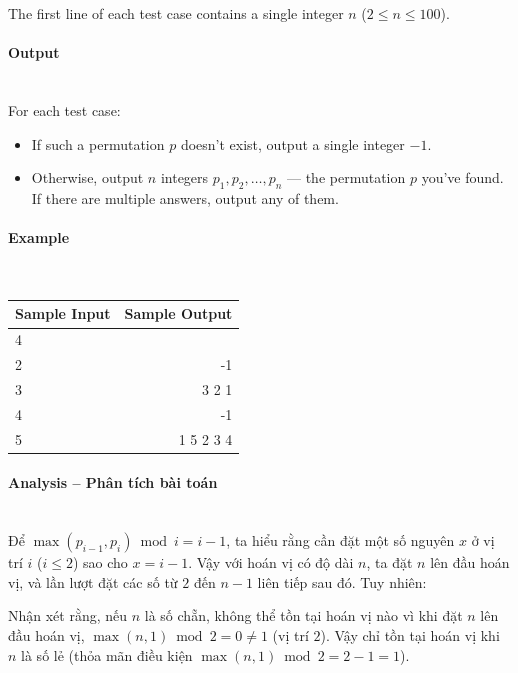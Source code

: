 \documentclass{article}
\begin{document}
The first line of each test case contains a single integer $n$ ($2 \le n \le 100$).

\paragraph{Output}\mbox{} \\

For each test case:

\begin{itemize}
    \item If such a permutation $p$ doesn't exist, output a single integer $-1$.
    \item Otherwise, output $n$ integers $p_1, p_2, \ldots, p_n$ — the permutation $p$ you’ve found. If there are multiple answers, output any of them.
\end{itemize}

\paragraph{Example}\mbox{} \\

\begin{table}[h]
    \centering
    \begin{tabular}{|l|r|}
        \hline
        \rowcolor{gray!30}
        \textbf{Sample Input} & \textbf{Sample Output} \\
        \hline
        4 & \\
        2 & -1 \\
        3 & 3 2 1 \\
        4 & -1 \\
        5 & 1 5 2 3 4 \\
        \hline
    \end{tabular}
\end{table}


\paragraph{Analysis -- Phân tích bài toán} \mbox{} \\

Để $\max(p_{i-1}, p_i) \bmod i = i - 1$, ta hiểu rằng cần đặt một số nguyên $x$ ở vị trí $i$ ($i \leq 2$) sao cho $x = i - 1$. Vậy với hoán vị có độ dài $n$, ta đặt $n$ lên đầu hoán vị, và lần lượt đặt các số từ $2$ đến $n - 1$ liên tiếp sau đó. Tuy nhiên:

Nhận xét rằng, nếu $n$ là số chẵn, không thể tồn tại hoán vị nào vì khi đặt $n$ lên đầu hoán vị, $\max(n, 1) \bmod 2 = 0 \ne 1$ (vị trí $2$). Vậy chỉ tồn tại hoán vị khi $n$ là số lẻ (thỏa mãn điều kiện $\max(n, 1) \bmod 2 = 2 - 1 = 1$).
\end{document}
